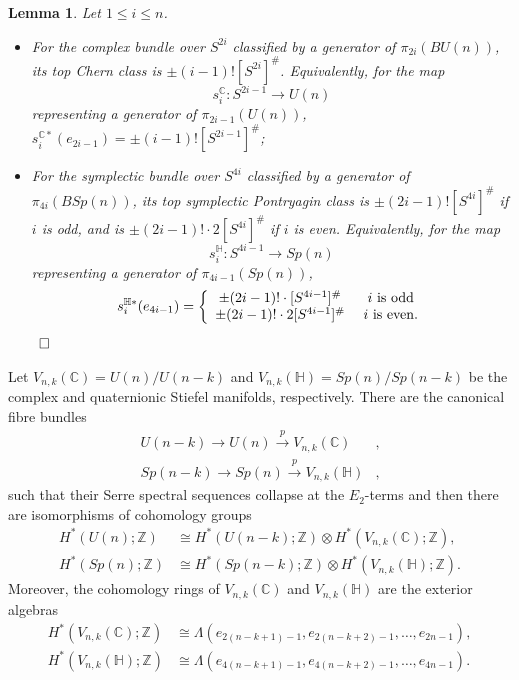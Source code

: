 \documentclass[a4]{amsart}
\newtheorem{lemma}[theorem]{Lemma}
\theoremstyle{definition}
\newcommand{\qqed}{\hfill\Box}
\begin{document}
\begin{sloppypar}
\begin{lemma}\label{BHlemma}
Let $1\leq i\leq n$. 
\begin{itemize}
\item For the complex bundle over $S^{2i}$ classified by a generator of $\pi_{2i}(BU(n))$, its top Chern class is $\pm (i-1)! [S^{2i}]^{\#}$. Equivalently, for the map 
\[
s_i^{\mathbb{C}}: S^{2i-1}\stackrel{}{\longrightarrow}  U(n)
\] 
representing a generator of $\pi_{2i-1}(U(n))$, $s_i^{\mathbb{C}\ast}(e_{2i-1})=\pm (i-1)! [S^{2i-1}]^{\#}$; 
\item For the symplectic bundle over $S^{4i}$ classified by a generator of $\pi_{4i}(BSp(n))$, its top symplectic Pontryagin class is $\pm (2i-1)! [S^{4i}]^{\#}$ if $i$ is odd, and is $\pm (2i-1)! \cdot 2[S^{4i}]^{\#}$ if $i$ is even. Equivalently, for the map 
\[
s_i^{\mathbb{H}}: S^{4i-1}\stackrel{}{\longrightarrow}  Sp(n)
\] 
representing a generator of $\pi_{4i-1}(Sp(n))$, 
\[
s_i^{\mathbb{H}\ast}(e_{4i-1})=
\left\{\begin{array}{cc}
\pm (2i-1)!\cdot  [S^{4i-1}]^{\#}  & ~i~{\rm is}~{\rm odd} \\
\pm (2i-1)! \cdot 2[S^{4i-1}]^{\#} & ~i~{\rm is}~{\rm even}.
\end{array}\right.
\]
~$\qqed$
\end{itemize}
\end{lemma}

Let $V_{n,k}(\mathbb{C})=U(n)/U(n-k)$ and $V_{n,k}(\mathbb{H})=Sp(n)/Sp(n-k)$ be the complex and quaternionic Stiefel manifolds, respectively. There are the canonical fibre bundles
\begin{equation}\label{V=Uqeq}
\begin{split}
U(n-k)\stackrel{}{\longrightarrow} U(n)\stackrel{p}{\longrightarrow}  V_{n,k}(\mathbb{C})&, \\
Sp(n-k)\stackrel{}{\longrightarrow} Sp(n)\stackrel{p}{\longrightarrow}  V_{n,k}(\mathbb{H})&,
\end{split}
\end{equation}
such that their Serre spectral sequences collapse at the $E_2$-terms and then there are isomorphisms of cohomology groups
\[
\begin{split}
H^\ast(U(n);\mathbb{Z})&\cong H^\ast(U(n-k);\mathbb{Z})\otimes H^\ast(V_{n,k}(\mathbb{C});\mathbb{Z}), \\
H^\ast(Sp(n);\mathbb{Z})&\cong H^\ast(Sp(n-k);\mathbb{Z})\otimes H^\ast(V_{n,k}(\mathbb{H});\mathbb{Z}).
\end{split}
\] 
Moreover, the cohomology rings of $V_{n,k}(\mathbb{C})$ and $V_{n,k}(\mathbb{H})$ are the  exterior algebras 
\[
\begin{split}
H^\ast(V_{n,k}(\mathbb{C});\mathbb{Z})&\cong \Lambda (e_{2(n-k+1)-1}, e_{2(n-k+2)-1},\ldots, e_{2n-1}),\\
H^\ast(V_{n,k}(\mathbb{H});\mathbb{Z})&\cong \Lambda (e_{4(n-k+1)-1}, e_{4(n-k+2)-1},\ldots, e_{4n-1}).
\end{split}
\]



\end{sloppypar}
\end{document}
